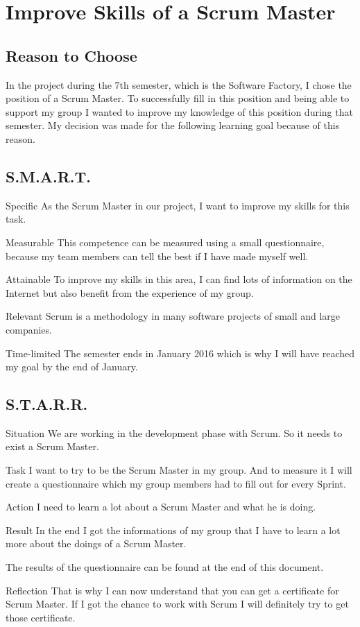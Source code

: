\section{Improve Skills of a Scrum Master}
	\subsection{Reason to Choose}
		In the project during the 7th semester, which is the Software Factory, I chose the position of a Scrum Master. To successfully fill in this position and being able to support my group I wanted to improve my knowledge of this position during that semester.
		My decision was made for the following learning goal because of this reason.

	\subsection{S.M.A.R.T.}
	\begin{SMART}
	    \item[Specific] As the Scrum Master in our project, I want to improve my skills for this task.
	    \item[Measurable] This competence can be measured using a small questionnaire, because my team members can tell the best if I have made myself well.
	    \item[Attainable] To improve my skills in this area, I can find lots of information on the Internet but also benefit from the experience of my group.
	    \item[Relevant] Scrum is a methodology in many software projects of small and large companies.
	    \item[Time-limited] The semester ends in January 2016 which is why I will have reached my goal by the end of January.
	\end{SMART}
	
	\subsection{S.T.A.R.R.}
	\begin{STARR}
	    \item[Situation] We are working in the development phase with Scrum. So it needs to exist a Scrum Master.
	    \item[Task] I want to try to be the Scrum Master in my group. And to measure it I will create a questionnaire which my group members had to fill out for every Sprint.
	    \item[Action] I need to learn a lot about a Scrum Master and what he is doing.
	    \item[Result] In the end I got the informations of my group that I have to learn a lot more about the doings of a Scrum Master.
	    
	    		The results of the questionnaire can be found at the end of this document.
	    \item[Reflection] That is why I can now understand that you can get a certificate for Scrum Master. If I got the chance to work with Scrum I will definitely try to get those certificate.
	\end{STARR}